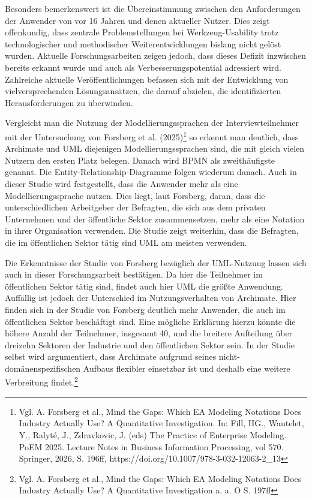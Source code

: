 Besonders bemerkenswert ist die Übereinstimmung zwischen den Anforderungen der Anwender von vor 16 Jahren und denen aktueller Nutzer. Dies zeigt offenkundig, dass zentrale Problemstellungen bei Werkzeug-Usability trotz technologischer und methodischer Weiterentwicklungen bislang nicht gelöst wurden. 
Aktuelle Forschungsarbeiten zeigen jedoch, dass dieses Defizit inzwischen bereits erkannt wurde und auch als Verbesserungspotential adressiert wird. Zahlreiche aktuelle Veröffentlichungen befassen sich mit der Entwicklung von vielversprechenden Lösungsansätzen, die darauf abzielen, die identifizierten Herausforderungen zu überwinden.

Vergleicht man die Nutzung der Modellierungssprachen der Interviewteilnehmer mit der Untersuchung von Forsberg et al. (2025)\footnote{Vgl. A. Forsberg et al., Mind the Gaps: Which EA Modeling Notations Does Industry Actually Use? A Quantitative Investigation. In: Fill, HG., Wautelet, Y., Ralyté, J., Zdravkovic, J. (eds) The Practice of Enterprise Modeling. PoEM 2025. Lecture Notes in Business Information Processing, vol 570. Springer, 2026, S. 196ff, https://doi.org/10.1007/978-3-032-12063-2_13 } so erkennt man deutlich, dass Archimate und UML diejenigen Modellierungssprachen sind, die mit gleich vielen Nutzern den ersten Platz belegen. Danach wird BPMN als zweithäufigste genannt. Die Entity-Relationship-Diagramme folgen wiederum danach.  Auch in dieser Studie wird festgestellt, dass die Anwender mehr als eine Modellierungssprache nutzen. Dies liegt, laut Forsberg, daran, dass die unterschiedlichen Arbeitgeber der Befragten, die sich aus dem privaten Unternehmen und der öffentliche Sektor zusammensetzen, mehr als eine Notation in ihrer Organisation verwenden. Die Studie zeigt weiterhin, dass die Befragten, die im öffentlichen Sektor tätig sind UML am meisten verwenden.

Die Erkenntnisse der Studie von Forsberg bezüglich der UML-Nutzung lassen sich auch in dieser Forschungsarbeit bestätigen. Da hier die Teilnehmer im öffentlichen Sektor tätig sind, findet auch hier UML die größte Anwendung. Auffällig ist jedoch der Unterschied im Nutzungsverhalten von Archimate. Hier finden sich in der Studie von Forsberg deutlich mehr Anwender, die auch im öffentlichen Sektor beschäftigt sind. Eine mögliche Erklärung hierzu könnte die höhere Anzahl der Teilnehmer, insgesamt 40, und die breitere Aufteilung über dreizehn Sektoren der Industrie und den öffentlichen Sektor sein. In der Studie selbst wird argumentiert, dass Archimate aufgrund seines nicht-domänenspezifischen Aufbaus flexibler einsetzbar ist und deshalb eine weitere Verbreitung findet.\footnote{Vgl. A. Forsberg et al., Mind the Gaps: Which EA Modeling Notations Does Industry Actually Use? A Quantitative Investigation a. a. O S. 197ff}

